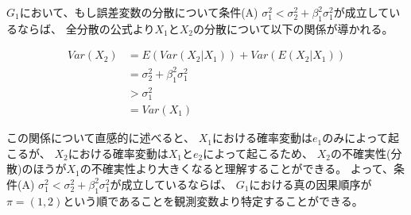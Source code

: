 $G_1$において、もし誤差変数の分散について条件(A)
$\sigma_1^2 < \sigma_2^2 + \beta_1^2 \sigma_1^2$が成立しているならば、
全分散の公式より$X_1$と$X_2$の分散について以下の関係が導かれる。

\begin{align*}
  \mathit{Var}(X_2) &= E(\mathit{Var}(X_2|X_1)) + \mathit{Var}(E(X_2|X_1)) \\
                    &= \sigma_2^2 + \beta_1^2 \sigma_1^2 \\
                    &> \sigma_1^2 \\
                    &= \mathit{Var}(X_1)
\end{align*}

この関係について直感的に述べると、
$X_1$における確率変動は$e_1$のみによって起こるが、
$X_2$における確率変動は$X_1$と$e_2$によって起こるため、
$X_2$の不確実性(分散)のほうが$X_1$の不確実性より大きくなると理解することができる。
よって、条件(A) $\sigma_1^2 < \sigma_2^2 + \beta_1^2 \sigma_1^2$が成立しているならば、
$G_1$における真の因果順序が$\pi = (1,2)$という順であることを観測変数より特定することができる。

